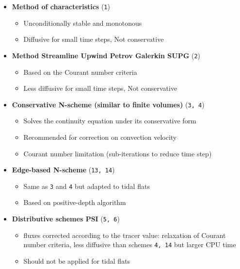 \begin{itemize}
\item \textbf{Method of characteristics} (\texttt{1}) 
\begin{itemize}
\item Unconditionally stable and monotonous
\item Diffusive for small time steps, Not conservative
\end{itemize}
\item \textbf{Method Streamline Upwind Petrov Galerkin SUPG} (\texttt{2}) 
\begin{itemize}
\item Based on the Courant number criteria
\item Less diffusive for small time steps, Not conservative
\end{itemize}
\item \textbf{Conservative N-scheme (similar to finite volumes)} (\texttt{3, 4})
\begin{itemize}
\item Solves the continuity equation under its conservative form
\item Recommended for correction on convection velocity 
\item Courant number limitation (sub-iterations to reduce time step)
\end{itemize}
\item \textbf{Edge-based N-scheme} (\texttt{13, 14})
\begin{itemize}
\item Same as \texttt{3} and \texttt{4} but adapted to tidal flats
\item Based on positive-depth algorithm 
\end{itemize}
\item \textbf{Distributive schemes PSI} (\texttt{5, 6}) 
\begin{itemize}
\item fluxes corrected according to the tracer value: relaxation of Courant number criteria, less diffusive than
schemes \texttt{4, 14} but larger CPU time
\item Should not be applied for tidal flats
\end{itemize}
\end{itemize}

